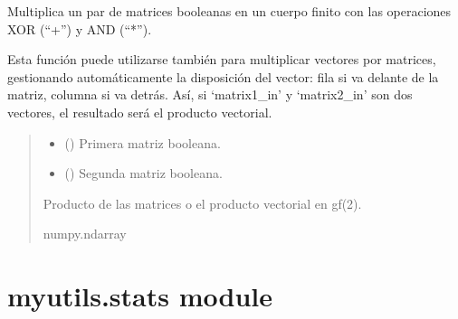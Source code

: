 \documentclass[letterpaper,10pt,english]{sphinxmanual}
\begin{document}
\begin{fulllineitems}
\label{\detokenize{myutils:myutils.bool.matrix_multiply_gf2}}
\pysigstartsignatures
{}
\pysigstopsignatures
\sphinxAtStartPar
Multiplica un par de matrices booleanas en un cuerpo finito con las operaciones XOR (“+”) y AND (“*”).

\sphinxAtStartPar
Esta función puede utilizarse también para multiplicar vectores por matrices, gestionando automáticamente
la disposición del vector: fila si va delante de la matriz, columna si va detrás. Así, si ‘matrix1\_in’ y
‘matrix2\_in’ son dos vectores, el resultado será el producto vectorial.
\begin{quote}\begin{description}
\begin{itemize}
\item {} 
\sphinxAtStartPar
{} () \textendash{} Primera matriz booleana.

\item {} 
\sphinxAtStartPar
{} () \textendash{} Segunda matriz booleana.

\end{itemize}

\sphinxAtStartPar
Producto de las matrices o el producto vectorial en gf(2).

\sphinxAtStartPar
numpy.ndarray

\end{description}\end{quote}

\end{fulllineitems}



\section{myutils.stats module}
\label{\detokenize{myutils:module-myutils.stats}}\label{\detokenize{myutils:myutils-stats-module}}
\end{document}
